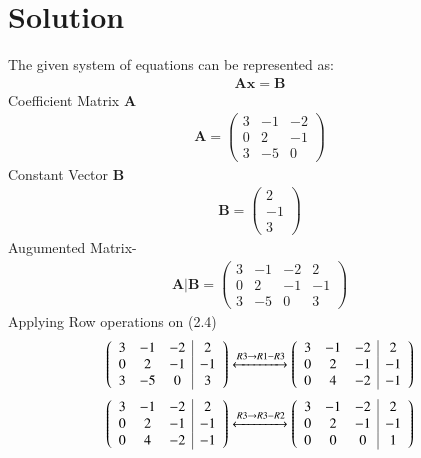 \documentclass[journal,13pt,twocolumn]{IEEEtran}
\newcommand{\myvec}[1]{\ensuremath{\begin{pmatrix}#1\end{pmatrix}}}
\renewcommand{\vec}[1]{\mathbf{#1}}
\begin{document}
\section{\textbf{Solution}}
The given system of equations can be represented as:
 \begin{align}
 \vec{A}\vec{x}=\vec{B}
 \end{align}
Coefficient Matrix $\vec{A}$
\begin{align}
\vec{A} = \myvec
            {3 & -1 & -2\\
            0 & 2 & -1\\
            3 & -5 & 0}  
\end{align}   
Constant Vector $\vec{B}$
\begin{align}                         
\vec{B} = \myvec{
            2\\
            -1\\
            3}
\end{align}            
Augumented Matrix-
\begin{align}
\vec{A}|\vec{B}=\left(\begin{array}{ccc|c}  
 3 & -1 & -2 & 2\\  
 0 & 2 & -1 & -1\\
 3 & -5 & 0 & 3
\end{array}\right) 
\end{align}
 Applying Row operations on (2.4)\\
\begin{align}
   \left(\begin{array}{ccc|c}  
 3 & -1 & -2 & 2\\  
 0 & 2 & -1 & -1\\
 3 & -5 & 0 & 3
\end{array}\right)\xleftrightarrow[]{R3\rightarrow R1-R3} \left(\begin{array}{ccc|c}  
 3 & -1 & -2 & 2\\  
 0 & 2 & -1 & -1\\
 0 & 4 & -2 & -1
\end{array}\right)
\end{align}
\begin{align}
\left(\begin{array}{ccc|c}  
 3 & -1 & -2 & 2\\  
 0 & 2 & -1 & -1\\
 0 & 4 & -2 & -1
\end{array}\right)\xleftrightarrow[]{R3\rightarrow R3-R2}
\left(\begin{array}{ccc|c}  
 3 & -1 & -2 & 2\\  
 0 & 2 & -1 & -1\\
 0 & 0 & 0 & 1
\end{array}\right)
\end{align}
\end{document}
